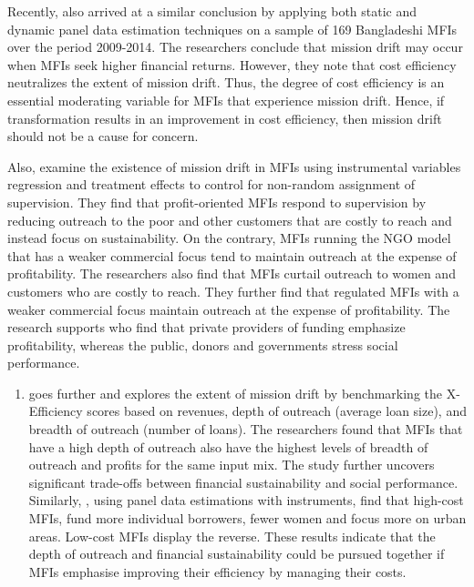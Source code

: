 \documentclass[a4paper,nobind]{templates/ociamthesis}
\providecommand{\tightlist}{%
  \setlength{\itemsep}{0pt}\setlength{\parskip}{0pt}}
\begin{document}
Recently, \textcite{mia2017mission} also arrived at a similar conclusion by applying both static and dynamic panel data estimation techniques on a sample of 169 Bangladeshi MFIs over the period 2009-2014. The researchers conclude that mission drift may occur when MFIs seek higher financial returns. However, they note that cost efficiency neutralizes the extent of mission drift. Thus, the degree of cost efficiency is an essential moderating variable for MFIs that experience mission drift. Hence, if transformation results in an improvement in cost efficiency, then mission drift should not be a cause for concern.

Also, \textcite{cull2011does} examine the existence of mission drift in MFIs using instrumental variables regression and treatment effects to control for non-random assignment of supervision. They find that profit-oriented MFIs respond to supervision by reducing outreach to the poor and other customers that are costly to reach and instead focus on sustainability. On the contrary, MFIs running the NGO model that has a weaker commercial focus tend to maintain outreach at the expense of profitability. The researchers also find that MFIs curtail outreach to women and customers who are costly to reach. They further find that regulated MFIs with a weaker commercial focus maintain outreach at the expense of profitability. The research supports \textcite{cobb2016funding} who find that private providers of funding emphasize profitability, whereas the public, donors and governments stress social performance.

\begin{enumerate}
\def\labelenumi{\arabic{enumi})}
\tightlist
\item
  goes further and explores the extent of mission drift by benchmarking the X-Efficiency scores based on revenues, depth of outreach (average loan size), and breadth of outreach (number of loans). The researchers found that MFIs that have a high depth of outreach also have the highest levels of breadth of outreach and profits for the same input mix. The study further uncovers significant trade-offs between financial sustainability and social performance. Similarly, \textcite{mersland2010microfinance}, using panel data estimations with instruments, find that high-cost MFIs, fund more individual borrowers, fewer women and focus more on urban areas. Low-cost MFIs display the reverse. These results indicate that the depth of outreach and financial sustainability could be pursued together if MFIs emphasise improving their efficiency by managing their costs.
\end{enumerate}
\end{document}
